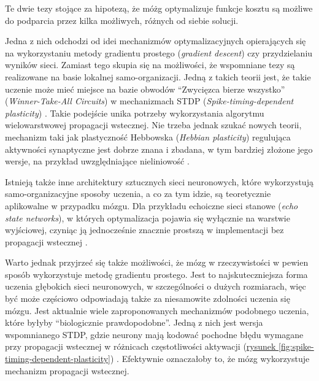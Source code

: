Te dwie tezy stojące za hipotezą, że móżg optymalizuje funkcje kosztu są możliwe do podparcia przez kilka możliwych, różnych od siebie solucji.

Jedna z nich odchodzi od idei mechanizmów optymalizacyjnych opierających się na wykorzystaniu metody gradientu prostego (\emph{gradient descent}) czy przydzielaniu wyników sieci.
Zamiast tego skupia się na możliwości, że wspomniane tezy są realizowane na basie lokalnej samo-organizacji.
Jedną z takich teorii jest, że takie uczenie może mieć miejsce na bazie obwodów ``Zwycięzca bierze wszystko'' (\emph{Winner-Take-All Circuits}) w mechanizmach STDP (\emph{Spike-timing-dependent plasticity}) \cite{kappel2014stdp}.
Takie podejście unika potrzeby wykorzystania algorytmu wielowarstwowej propagacji wstecznej.
Nie trzeba jednak szukać nowych teorii, mechanizm taki jak plastyczność Hebbowska (\emph{Hebbian plasticity}) regulująca aktywności synaptyczne jest dobrze znana i zbadana, w tym bardziej złożone jego wersje, na przykład uwzględniające nieliniowość \cite{brito2016nonlinear}.

Istnieją także inne architektury sztucznych sieci neuronowych, które wykorzystują samo-organizacyjne sposoby uczenia, a co za tym idzie, są teoretycznie aplikowalne w przypadku mózgu.
Dla przykładu echoiczne sieci stanowe (\emph{echo state networks}), w których optymalizacja pojawia się wyłącznie na warstwie wyjściowej, czyniąc ją jednocześnie znacznie prostszą w implementacji bez propagacji wstecznej \cite{jaeger2004harnessing}.

Warto jednak przyjrzeć się także możliwości, że mózg w rzeczywistości w pewien sposób wykorzystuje metodę gradientu prostego.
Jest to najskuteczniejsza forma uczenia głębokich sieci neuronowych, w szczególności o dużych rozmiarach, więc być może częściowo odpowiadają także za niesamowite zdolności uczenia się mózgu.
Jest aktualnie wiele zaproponowanych mechanizmów podobnego uczenia, które byłyby ``biologicznie prawdopodobne''.
Jedną z nich jest wersja wspomnianego STDP, gdzie neurony mają kodować pochodne błędu wymagane przy propagacji wstecznej w różnicach częstotliwości aktywacji (\hyperref[fig:spike-timing-dependent-plasticity]{rysunek \ref*{fig:spike-timing-dependent-plasticity}}) \cite{hinton2016can}.
Efektywnie oznaczałoby to, że mózg wykorzystuje mechanizm propagacji wstecznej.

